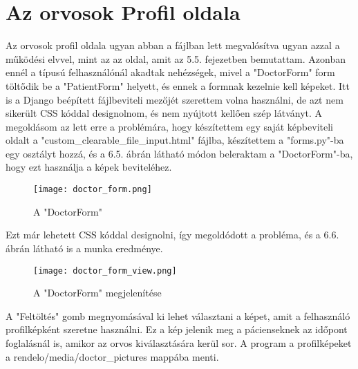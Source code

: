 \section{Az orvosok Profil oldala}

Az orvosok profil oldala ugyan abban a fájlban lett megvalósítva ugyan azzal a működési elvvel, mint az az oldal, amit az 5.5. fejezetben bemutattam. Azonban ennél a típusú felhasználónál akadtak nehézségek, mivel a "DoctorForm" form töltődik be a "PatientForm" helyett, és ennek a formnak kezelnie kell képeket. Itt is a Django beépített fájlbeviteli mezőjét szerettem volna használni, de azt nem sikerült CSS kóddal designolnom, és nem nyújtott kellően szép látványt. A megoldásom az lett erre a problémára, hogy készítettem egy saját képbeviteli oldalt a "custom\_clearable\_file\_input.html" fájlba, készítettem a "forms.py"-ba egy osztályt hozzá, és a 6.5. ábrán látható módon beleraktam a "DoctorForm"-ba, hogy ezt használja a képek beviteléhez.

\begin{figure}[H]
	\caption{A "DoctorForm"}
	\label{fig:doctorform}
	\centering
	\texttt{[image: doctor\_form.png]}
\end{figure}

Ezt már lehetett CSS kóddal designolni, így megoldódott a probléma, és a 6.6. ábrán látható is a munka eredménye.

\begin{figure}[H]
	\caption{A "DoctorForm" megjelenítése}
	\label{fig:doctorformview}
	\centering
	\texttt{[image: doctor\_form\_view.png]}
\end{figure}

A "Feltöltés" gomb megnyomásával ki lehet választani a képet, amit a felhasználó profilképként szeretne használni. Ez a kép jelenik meg a pácienseknek az időpont foglalásnál is, amikor az orvos kiválasztására kerül sor. A program a profilképeket a rendelo/media/doctor\_pictures mappába menti.



